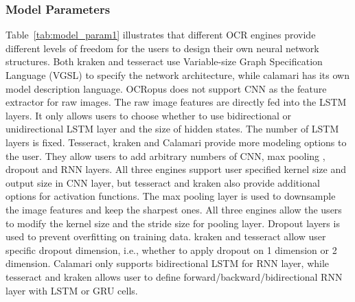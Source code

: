 \documentclass[sigconf]{acmart}
\begin{document}
\subsubsection{Model Parameters}
Table~\ref{tab:model_param1} illustrates that different OCR engines provide
different levels of freedom for the users to design their own neural network
structures. Both kraken and tesseract use Variable-size Graph Specification Language (VGSL) to specify the network architecture, while calamari has its own model description language. OCRopus does not support CNN as the feature extractor for raw
images. The raw image features are directly fed into the LSTM layers. It only
allows users to choose whether to use bidirectional or unidirectional LSTM
layer and the size of hidden states. The number of LSTM layers is fixed.
Tesseract, kraken and Calamari provide more modeling options to the user. They
allow users to add arbitrary numbers of CNN, max pooling \cite{boureau2010theoretical}, dropout \cite{srivastava2014dropout} and RNN
layers. All three engines support user specified kernel size and output size in
CNN layer, but tesseract and kraken also provide additional options for
activation functions. The max pooling layer is used to downsample the image features and keep the sharpest ones. All three engines allow the users to modify the kernel size and the stride size for pooling layer. Dropout layers is used to prevent overfitting on training data. kraken and tesseract allow user specific dropout dimension, i.e., whether to apply dropout on 1 dimension or 2 dimension. Calamari only supports bidirectional LSTM for RNN layer, while tesseract and kraken allows user to define forward/backward/bidirectional RNN layer with LSTM or GRU cells.

\end{document}
